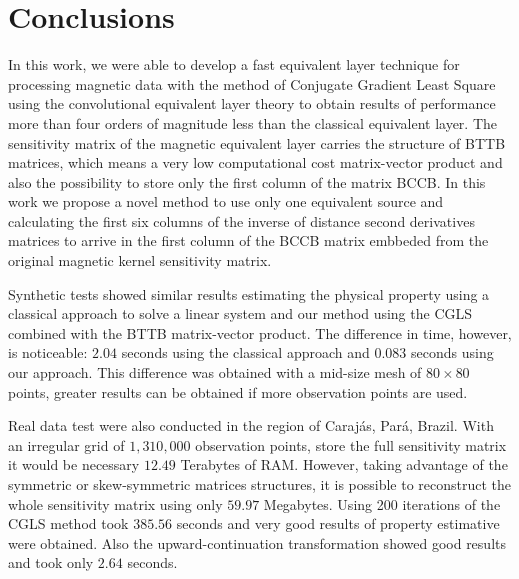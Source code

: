 \section{Conclusions}

In this work, we were able to develop a fast equivalent layer technique for processing magnetic data with the method of Conjugate Gradient Least Square using the convolutional equivalent layer theory to obtain results of performance more than four orders of magnitude less than the classical equivalent layer. The sensitivity matrix of the magnetic equivalent layer carries the structure of BTTB matrices, which means a very low computational cost matrix-vector product and also the possibility to store only the first column of the matrix BCCB. In this work we propose a novel method to use only one equivalent source and calculating the first six columns of the inverse of distance second derivatives matrices to arrive in the first column of the BCCB matrix embbeded from the original magnetic kernel sensitivity matrix.

Synthetic tests showed similar results estimating the physical property using a classical approach to solve a linear system and our method using the CGLS combined with the BTTB matrix-vector product. The difference in time, however, is noticeable: $2.04$ seconds using the classical approach and $0.083$ seconds using our approach. This difference was obtained with a mid-size mesh of $80 \times 80$ points, greater results can be obtained if more observation points are used.

Real data test were also conducted in the region of Carajás, Pará, Brazil. With an irregular grid of $1,310,000$ observation points, store the full sensitivity matrix it would be necessary $12.49$ Terabytes of RAM.  However, taking advantage of the symmetric or skew-symmetric matrices structures, it is possible to reconstruct the whole sensitivity matrix using only $59.97$ Megabytes.
Using 200 iterations of the CGLS method took $385.56$ seconds and very good results of property estimative were obtained. Also the upward-continuation transformation showed good results and took only $2.64$ seconds.
